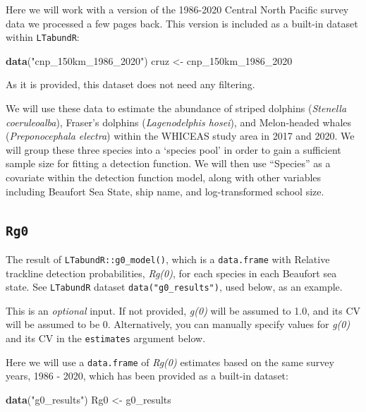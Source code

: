 \documentclass[
]{book}
\newenvironment{Shaded}{\begin{snugshade}}{\end{snugshade}}
\newcommand{\DecValTok}[1]{\textcolor[rgb]{0.00,0.00,0.81}{#1}}
\newcommand{\KeywordTok}[1]{\textcolor[rgb]{0.13,0.29,0.53}{\textbf{#1}}}
\newcommand{\NormalTok}[1]{#1}
\newcommand{\StringTok}[1]{\textcolor[rgb]{0.31,0.60,0.02}{#1}}
\begin{document}
Here we will work with a version of the 1986-2020 Central North Pacific survey data we processed a few pages back. This version is included as a built-in dataset within \texttt{LTabundR}:

\begin{Shaded}
\begin{Highlighting}[]
\KeywordTok{data}\NormalTok{(}\StringTok{"cnp_150km_1986_2020"}\NormalTok{)}
\NormalTok{cruz <-}\StringTok{ }\NormalTok{cnp_150km_}\DecValTok{1986}\NormalTok{_}\DecValTok{2020}
\end{Highlighting}
\end{Shaded}

As it is provided, this dataset does not need any filtering.

We will use these data to estimate the abundance of striped dolphins (\emph{Stenella coeruleoalba}), Fraser's dolphins (\emph{Lagenodelphis hosei}), and Melon-headed whales (\emph{Preponocephala electra}) within the WHICEAS study area in 2017 and 2020. We will group these three species into a `species pool' in order to gain a sufficient sample size for fitting a detection function. We will then use ``Species'' as a covariate within the detection function model, along with other variables including Beaufort Sea State, ship name, and log-transformed school size.

\hypertarget{rg0}{%
\subsection*{\texorpdfstring{\texttt{Rg0}}{Rg0}}\label{rg0}}

The result of \texttt{LTabundR::g0\_model()}, which is a \texttt{data.frame} with Relative trackline detection probabilities, \emph{Rg(0)}, for each species in each Beaufort sea state. See \texttt{LTabundR} dataset \texttt{data("g0\_results")}, used below, as an example.

This is an \emph{optional} input. If not provided, \emph{g(0)} will be assumed to 1.0, and its CV will be assumed to be 0. Alternatively, you can manually specify values for \emph{g(0)} and its CV in the \texttt{estimates} argument below.

Here we will use a \texttt{data.frame} of \emph{Rg(0)} estimates based on the same survey years, 1986 - 2020, which has been provided as a built-in dataset:

\begin{Shaded}
\begin{Highlighting}[]
\KeywordTok{data}\NormalTok{(}\StringTok{"g0_results"}\NormalTok{)}
\NormalTok{Rg0 <-}\StringTok{ }\NormalTok{g0_results}
\end{Highlighting}
\end{Shaded}
\end{document}
